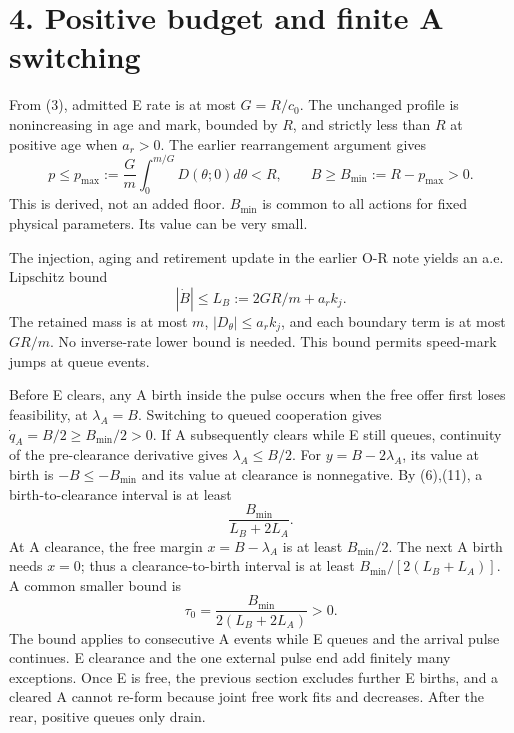 \documentclass[11pt,a4paper]{article}
\begin{document}
\newpage
\section*{4. Positive budget and finite A switching}
From (3), admitted E rate is at most $G=R/c_0$. The unchanged profile
is nonincreasing in age and mark, bounded by $R$, and strictly less than
$R$ at positive age when $a_r>0$. The earlier rearrangement argument gives
\begin{equation}
 p\leq p_{\max}:=\frac Gm\int_0^{m/G}D(\theta;0)d\theta<R,
 \qquad B\geq B_{\min}:=R-p_{\max}>0.\tag{10}
\end{equation}
This is derived, not an added floor. $B_{\min}$ is common to all actions
for fixed physical parameters. Its value can be very small.

The injection, aging and retirement update in the earlier O-R note yields
an a.e. Lipschitz bound
\begin{equation}
 |\dot B|\leq L_B:=2GR/m+a_rk_j.\tag{11}
\end{equation}
The retained mass is at most $m$, $|D_\theta|\leq a_rk_j$, and each
boundary term is at most $GR/m$. No inverse-rate lower bound is needed.
This bound permits speed-mark jumps at queue events.

Before E clears, any A birth inside the pulse occurs when the free offer
first loses feasibility, at $\lambda_A=B$. Switching to queued cooperation
gives $\dot q_A=B/2\geq B_{\min}/2>0$. If A subsequently clears
while E still queues, continuity of the pre-clearance derivative gives
$\lambda_A\leq B/2$. For $y=B-2\lambda_A$, its value at birth is
$-B\leq-B_{\min}$ and its value at clearance is nonnegative. By
(6),(11), a birth-to-clearance interval is at least
\begin{equation}
 \frac{B_{\min}}{L_B+2L_A}.\tag{12}
\end{equation}
At A clearance, the free margin $x=B-\lambda_A$ is at least
$B_{\min}/2$. The next A birth needs $x=0$; thus a clearance-to-birth
interval is at least $B_{\min}/[2(L_B+L_A)]$. A common smaller bound is
\begin{equation}
 \tau_0=\frac{B_{\min}}{2(L_B+2L_A)}>0.\tag{13}
\end{equation}
The bound applies to consecutive A events while E queues and the arrival
pulse continues. E clearance and the one external pulse end add finitely
many exceptions. Once E is free, the previous section excludes further E
births, and a cleared A cannot re-form because joint free work fits and
decreases. After the rear, positive queues only drain.
\end{document}
